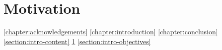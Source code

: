 \section{Motivation}
\label{section:intro-motivation}

\ref{chapter:acknowledgements}
\ref{chapter:introduction}
\ref{chapter:conclusion}
\ref{section:intro-content}
\ref{section:intro-motivation}
\ref{section:intro-objectives}